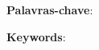 \setlength{\absparsep}{18pt} %
\begin{resumo}
	\OnehalfSpacing
	\imprimirresumotcc
	
	\textbf{Palavras-chave}: \imprimirpalavraschave
\end{resumo}

\begin{resumo}[Abstract]
	\OnehalfSpacing
	\imprimirabstracttcc
		
	\textbf{Keywords}: \imprimirkeywords
\end{resumo}




